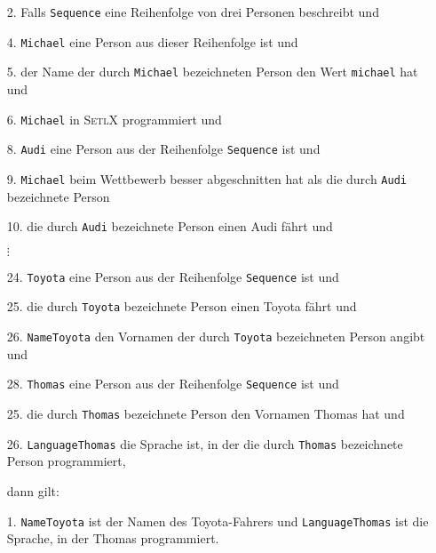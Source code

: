 \begin{enumerate}
\item[2.] Falls \texttt{Sequence} eine Reihenfolge von drei Personen beschreibt  und
\item[4.] \texttt{Michael} eine Person aus dieser Reihenfolge ist und
\item[5.] der Name der durch \texttt{Michael} bezeichneten Person den Wert \texttt{michael}
         hat und
\item[6.] \texttt{Michael} in \textsc{SetlX} programmiert und
\item[8.] \texttt{Audi} eine Person aus der Reihenfolge \texttt{Sequence} ist und
\item[9.] \texttt{Michael} beim Wettbewerb besser abgeschnitten hat als die durch \texttt{Audi} bezeichnete Person
\item[10.] die durch \texttt{Audi} bezeichnete Person einen Audi f\"{a}hrt und 

           $\vdots$

\item[24.] \texttt{Toyota} eine Person aus der Reihenfolge \texttt{Sequence} ist und
\item[25.] die durch \texttt{Toyota} bezeichnete Person einen Toyota f\"{a}hrt und
\item[26.] \texttt{NameToyota} den Vornamen der durch \texttt{Toyota} bezeichneten Person angibt und
\item[28.] \texttt{Thomas} eine Person aus der Reihenfolge \texttt{Sequence} ist und
\item[25.] die durch \texttt{Thomas} bezeichnete Person den Vornamen Thomas hat und
\item[26.] \texttt{LanguageThomas} die Sprache ist, in der die durch \texttt{Thomas}
          bezeichnete Person programmiert,

          dann gilt:

\item[1.] \texttt{NameToyota} ist der Namen des Toyota-Fahrers und
         \texttt{LanguageThomas} ist die Sprache, in der Thomas programmiert.
\end{enumerate}


